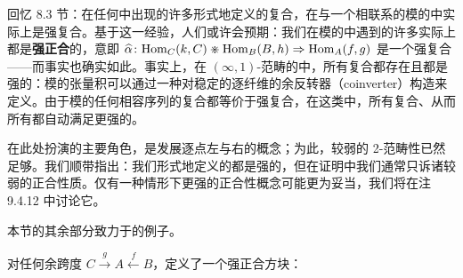 \begin{digression}[强正合性]\label{dig:strong-exactness}
回忆 8.3 节：在任何\trVirtualEquipment{}中出现的许多形式地定义的复合\trCell{}，在与一个\trInfinityCosmos{}相联系的模的\trVirtualEquipment{}中实际上是强复合。基于这一经验，人们或许会预期：我们在模的\trVirtualEquipment{}中遇到的许多\trExactSquare{}实际上都是\textbf{强正合}的，意即\trCell{}
$\widehat{\alpha}\colon\mathrm{Hom}_{C}(k,C)\divideontimes\mathrm{Hom}_{B}(B,h)\Rightarrow\mathrm{Hom}_{A}(f,g)$ 是一个强复合——而事实也确实如此。事实上，在 $(\infty,1)$-范畴的\trInfinityCosmos{}中，所有复合都存在且都是强的：模的张量积可以通过一种对\trPullback{}稳定的逐纤维的余反转器（coinverter）构造来定义。由于模的任何相容序列的复合都等价于强复合，在这类\trInfinityCosmos{}中，所有复合、从而所有\trExactSquare{}都自动满足更强的\trUniversalProperty{}。

\trExactSquare{}在此处扮演的主要角色，是发展逐点左\trExtension{}与右\trExtension{}的概念；为此，较弱的 2-范畴性\trUniversalProperty{}已然足够。我们顺带指出：我们形式地定义的\trExactSquare{}都是强的，但在证明中我们通常只诉诸较弱的正合性质。仅有一种情形下更强的正合性概念可能更为妥当，我们将在注 9.4.12 中讨论它。
\end{digression}

本节的其余部分致力于\trExactSquare{}的例子。

\begin{lemma}\label{lem:comma-squares-exact}
对任何余跨度 $C\overset{g}{\to}A\overset{f}{\gets}B$，\trCommaCone{}定义了一个强正合方块：
\begin{center}
\end{center}
\end{lemma}

